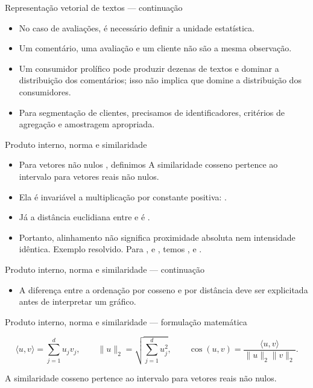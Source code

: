 \documentclass[10pt,aspectratio=169]{beamer}
\begin{document}
\begin{frame}[t]{Representação vetorial de textos — continuação}
\small
\begin{itemize}
\item No caso de avaliações, é necessário definir a unidade estatística.
\item Um comentário, uma avaliação e um cliente não são a mesma observação.
\item Um consumidor prolífico pode produzir dezenas de textos e dominar a distribuição dos comentários; isso não implica que domine a distribuição dos consumidores.
\item Para segmentação de clientes, precisamos de identificadores, critérios de agregação e amostragem apropriada.
\end{itemize}
\end{frame}

\begin{frame}[t]{Produto interno, norma e similaridade}
\small
\begin{itemize}
\item Para vetores não nulos , definimos A similaridade cosseno pertence ao intervalo para vetores reais não nulos.
\item Ela é invariável a multiplicação por constante positiva: .
\item Já a distância euclidiana entre e é .
\item Portanto, alinhamento não significa proximidade absoluta nem intensidade idêntica. Exemplo resolvido. Para , e , temos , e .
\end{itemize}
\end{frame}

\begin{frame}[t]{Produto interno, norma e similaridade — continuação}
\small
\begin{itemize}
\item A diferença entre a ordenação por cosseno e por distância deve ser explicitada antes de interpretar um gráfico.
\end{itemize}
\end{frame}

\begin{frame}[t]{Produto interno, norma e similaridade — formulação matemática}
\small
\vspace{3mm}\begin{center}\small\[\langle u,v\rangle=\sum_{j=1}^d u_jv_j,\qquad
\|u\|_2=\sqrt{\sum_{j=1}^d u_j^2},\qquad
\cos(u,v)=\frac{\langle u,v\rangle}{\|u\|_2\|v\|_2}.\]\end{center}
\vspace{3mm}\small A similaridade cosseno pertence ao intervalo para vetores reais não nulos.
\end{frame}
\end{document}
